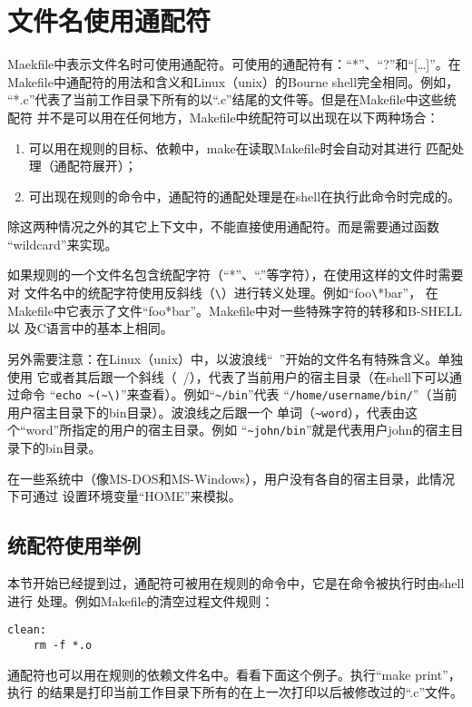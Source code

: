\section{文件名使用通配符}
Maekfile中表示文件名时可使用通配符。可使用的通配符有：“*”、“?”和“[…]”。在
Makefile中通配符的用法和含义和Linux（unix）的Bourne shell完全相同。例如，
“*.c”代表了当前工作目录下所有的以“.c”结尾的文件等。但是在Makefile中这些统配符
并不是可以用在任何地方，Makefile中统配符可以出现在以下两种场合：

\begin{enumerate}
\itemsep=0pt \parskip=0pt
\item       可以用在规则的目标、依赖中，make在读取Makefile时会自动对其进行
    匹配处理（通配符展开）；
\item 可出现在规则的命令中，通配符的通配处理是在shell在执行此命令时完成的。
\end{enumerate}

除这两种情况之外的其它上下文中，不能直接使用通配符。而是需要通过函数
“wildcard”来实现。

如果规则的一个文件名包含统配字符（“*”、“.”等字符），在使用这样的文件时需要对
文件名中的统配字符使用反斜线（\verb"\"）进行转义处理。例如“foo\verb"\"*bar”，
在Makefile中它表示了文件“foo*bar”。Makefile中对一些特殊字符的转移和B-SHELL以
及C语言中的基本上相同。

另外需要注意：在Linux（unix）中，以波浪线“~”开始的文件名有特殊含义。单独使用
它或者其后跟一个斜线（~/），代表了当前用户的宿主目录（在shell下可以通过命令
“\verb"echo ~(~\)"”来查看）。例如“\verb"~/bin"”代表
“\verb"/home/username/bin/"”（当前用户宿主目录下的bin目录）。波浪线之后跟一个
单词（\verb"~word"），代表由这个“word”所指定的用户的宿主目录。例如
“\verb"~john/bin"”就是代表用户john的宿主目录下的bin目录。

在一些系统中（像MS-DOS和MS-Windows），用户没有各自的宿主目录，此情况下可通过
设置环境变量“HOME”来模拟。

\subsection{统配符使用举例}
本节开始已经提到过，通配符可被用在规则的命令中，它是在命令被执行时由shell进行
处理。例如Makefile的清空过程文件规则：

\begin{Verbatim}[]
clean:
    rm -f *.o
\end{Verbatim}

通配符也可以用在规则的依赖文件名中。看看下面这个例子。执行“make print”，执行
的结果是打印当前工作目录下所有的在上一次打印以后被修改过的“.c”文件。

